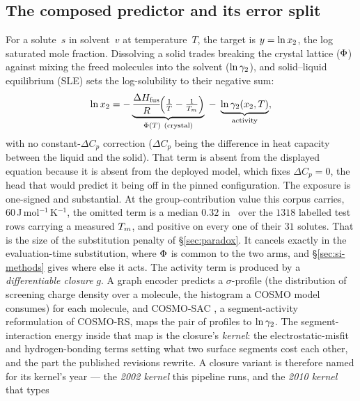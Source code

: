 \subsection{The composed predictor and its error split}
\label{sec:framework}
For a solute~$s$ in solvent~$v$ at temperature~$T$, the target is $y=\ln x_2$, the log saturated mole
fraction. Dissolving a solid trades breaking the crystal lattice ($\Phi$) against mixing the
freed molecules into the solvent ($\ln\gamma_2$), and solid--liquid equilibrium (SLE) sets the
log-solubility to their negative sum:
\begin{equation}
  \lnx = -\underbrace{\frac{\dHfus}{\Rgas}\!\Big(\tfrac1T-\tfrac1\Tm\Big)}_{\Phicry(T)\ \text{(crystal)}}
         \;-\;\underbrace{\lng(x_2,T)}_{\text{activity}} ,
  \label{eq:sle}
\end{equation}
with no constant-$\Delta C_p$ correction ($\Delta C_p$ being the difference in heat capacity
between the liquid and the solid). That term is absent from the displayed equation because it is
absent from the deployed model, which fixes $\Delta C_p=0$, the head that would predict it being off
in the pinned configuration. The exposure is one-signed and substantial. At the group-contribution value this corpus carries,
$60$\,J\,mol$^{-1}$\,K$^{-1}$, the omitted term is a median $0.32$ in \lnx\ over the $1318$
labelled test rows carrying a measured $T_m$, and positive on every one of their $31$ solutes.
That is the size of the substitution penalty of \S\ref{sec:paradox}. It cancels exactly in the evaluation-time substitution, where $\Phi$ is common to the two arms, and \S\ref{sec:si-methods} gives where else it acts. The activity term is produced by a
\emph{differentiable closure} $g$. A graph encoder predicts a $\sigma$-profile (the distribution of
screening charge density over a molecule, the histogram a COSMO model consumes) for each molecule,
and COSMO-SAC \cite{lin2002}, a segment-activity reformulation of COSMO-RS, maps the pair of
profiles to $\ln\gamma_2$. The segment-interaction energy inside that map is the closure's \emph{kernel}: the
electrostatic-misfit and hydrogen-bonding terms setting what two surface segments cost each other,
and the part the published revisions rewrite. A closure variant is therefore named for its kernel's
year --- the \emph{2002 kernel} this pipeline runs, and the \emph{2010 kernel} that types
